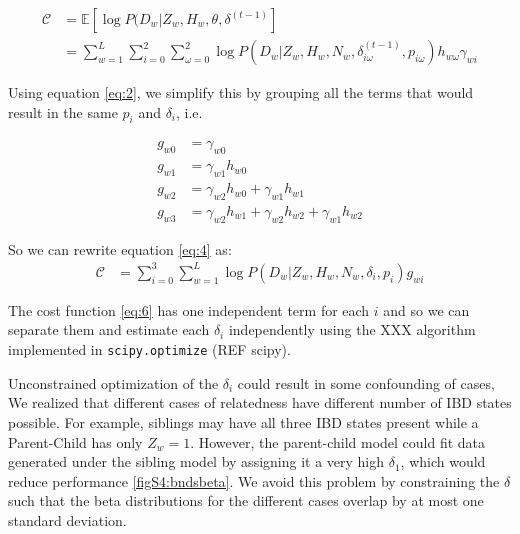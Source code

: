 \documentclass[12pt, letterpaper]{article}
\begin{document}
\begin{align}\label{eq:4}
\mathcal{C} &= \mathbb{E}[\log P(D_w|Z_w, H_w, \theta, \delta^{(t-1)}]\nonumber\\
&= \sum_{w=1}^L \sum_{i=0}^2\sum^2_{\omega=0} \log P(D_{w}|Z_w, H_w, N_w, \delta_{i \omega}^{(t-1)}, p_{i \omega})h_{w\omega}\gamma_{wi}
\end{align}


Using equation \ref{eq:2}, we simplify this by grouping all the terms that would result in the same $p_i$ and $\delta_i$, i.e.

\begin{align*}\label{eq:5}
g_{w0} &= \gamma_{w0}\\
g_{w1} &= \gamma_{w1} h_{w0}\\
g_{w2} &= \gamma_{w2} h_{w0} + \gamma_{w1} h_{w1}\\
g_{w3} &= \gamma_{w2} h_{w1} + \gamma_{w2} h_{w2} + \gamma_{w1} h_{w2}
\end{align*}

So we can rewrite equation \ref{eq:4} as:
\begin{align}\label{eq:6}
\mathcal{C} &= \sum_{i=0}^3 \sum_{w=1}^L \log P(D_{w}|Z_w, H_w, N_w, \delta_i, p_i)g_{wi}
\end{align}

The cost function \ref{eq:6} has one independent term for each $i$ and so we can separate them and estimate each $\delta_i$ independently using the XXX algorithm implemented in \texttt{scipy.optimize} (REF scipy). 


Unconstrained optimization of the $\delta_i$ could result in some confounding of cases, We realized that different cases of relatedness have different number of IBD states possible. For example, siblings may have all three IBD states present while a Parent-Child has only $Z_w=1$. However, the parent-child model could fit data generated under the sibling model by assigning it a very high $\delta_1$, which would reduce performance  \ref{figS4:bndsbeta}. We avoid this problem by constraining the $\delta$ such that the beta distributions for the different cases overlap by at most one standard deviation.
\end{document}
